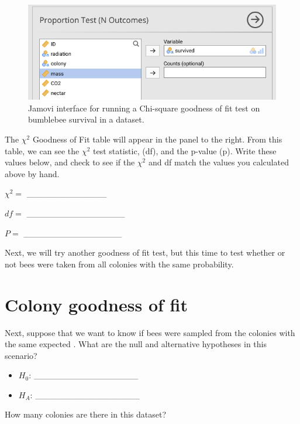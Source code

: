 \documentclass[
  openany]{krantz}
\begin{document}
\begin{figure}
\includegraphics[width=1\linewidth]{img/jamovi_goodness_of_fit_interface} \caption{Jamovi interface for running a Chi-square goodness of fit test on bumblebee survival in a dataset.}\label{fig:unnamed-chunk-133}
\end{figure}

The \(\chi^{2}\) Goodness of Fit table will appear in the panel to the right.
From this table, we can see the \(\chi^{2}\) test statistic,  (df), and the p-value (p).
Write these values below, and check to see if the \(\chi^{2}\) and df match the values you calculated above by hand.

\(\chi^{2} =\) \_\_\_\_\_\_\_\_\_\_\_\_\_

\(df =\) \_\_\_\_\_\_\_\_\_\_\_\_\_\_\_\_

\(P =\) \_\_\_\_\_\_\_\_\_\_\_\_\_\_\_\_

Next, we will try another goodness of fit test, but this time to test whether or not bees were taken from all colonies with the same probability.

\hypertarget{colony-goodness-of-fit}{%
\section{Colony goodness of fit}\label{colony-goodness-of-fit}}

Next, suppose that we want to know if bees were sampled from the colonies with the same expected .
What are the null and alternative hypotheses in this scenario?

\begin{itemize}
\item
  \(H_{0}\): \_\_\_\_\_\_\_\_\_\_\_\_\_\_\_\_\_
\item
  \(H_{A}\): \_\_\_\_\_\_\_\_\_\_\_\_\_\_\_\_\_
\end{itemize}

How many colonies are there in this dataset?
\end{document}
